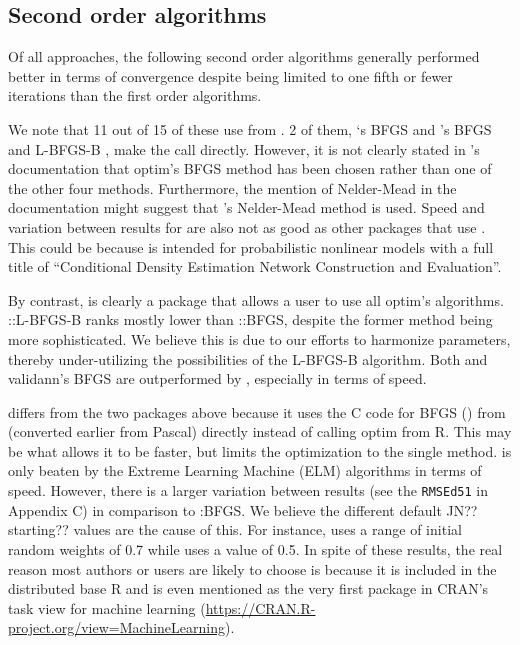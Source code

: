 \hypertarget{second-order-algorithms}{%
\subsection{Second order algorithms}\label{second-order-algorithms}}

Of all approaches, the following second order algorithms generally
performed better in terms of convergence despite being limited to one
fifth or fewer iterations than the first order algorithms.

We note that 11 out of 15 of these  use
 from . 2 of them, `s BFGS
\citep{R-CaDENCE} and 's BFGS and L-BFGS-B
\citep{R-validann}, make the call directly. However, it is not clearly
stated in 's documentation that optim's BFGS method has
been chosen rather than one of the other four methods. Furthermore, the
mention of Nelder-Mead in the documentation might suggest that
's Nelder-Mead method is used. Speed and variation between
results for  are also not as good as other packages
that use . This could be because  is
intended for probabilistic nonlinear models with a full title of
``Conditional Density Estimation Network Construction and Evaluation''.

By contrast,  is clearly a package that allows a user
to use all optim's algorithms. ::L-BFGS-B ranks mostly
lower than ::BFGS, despite the former method being
more sophisticated. We believe this is due to our efforts to harmonize
parameters, thereby under-utilizing the possibilities of the L-BFGS-B
algorithm. Both  and validann's BFGS are outperformed
by , especially in terms of speed.

 \citep{R-nnet} differs from the two packages above
because it uses the \textsf{C} code for BFGS () from
 (converted earlier from Pascal) directly instead of calling
optim from \textsf{R}. This may be what allows it to be faster, but
limits the optimization to the single method.  is only
beaten by the Extreme Learning Machine (ELM) algorithms in terms of
speed. However, there is a larger variation between results (see the
\texttt{RMSEd51} in Appendix C) in comparison to
:BFGS. We believe the different default JN??
starting?? values are the cause of this. For instance, 
uses a range of initial random weights of 0.7 while 
uses a value of 0.5. In spite of these results, the real reason most
authors or users are likely to choose  is because it is
included in the distributed base \textsf{R} and is even mentioned as the
very first package in CRAN's task view for machine learning
(\url{https://CRAN.R-project.org/view=MachineLearning}).

